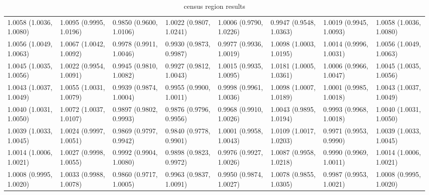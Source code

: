 \begin{table}[ht]
\begin{tabular}{llllllll}
  1.0058 (1.0036, 1.0080) & 1.0095 (0.9995, 1.0196) & 0.9850 (0.9600, 1.0106) & 1.0022 (0.9807, 1.0241) & 1.0006 (0.9790, 1.0226) & 0.9947 (0.9548, 1.0363) & 1.0019 (0.9945, 1.0093) & 1.0058 (1.0036, 1.0080) \\ 
  1.0056 (1.0049, 1.0063) & 1.0067 (1.0042, 1.0092) & 0.9978 (0.9911, 1.0046) & 0.9930 (0.9873, 0.9987) & 0.9977 (0.9936, 1.0019) & 1.0098 (1.0003, 1.0195) & 1.0014 (0.9996, 1.0031) & 1.0056 (1.0049, 1.0063) \\ 
  1.0045 (1.0035, 1.0056) & 1.0022 (0.9954, 1.0091) & 0.9945 (0.9810, 1.0082) & 0.9927 (0.9812, 1.0043) & 1.0015 (0.9935, 1.0095) & 1.0181 (1.0005, 1.0361) & 1.0006 (0.9966, 1.0047) & 1.0045 (1.0035, 1.0056) \\ 
  1.0043 (1.0037, 1.0049) & 1.0055 (1.0031, 1.0079) & 0.9939 (0.9874, 1.0004) & 0.9955 (0.9900, 1.0011) & 0.9998 (0.9961, 1.0036) & 1.0098 (1.0007, 1.0189) & 1.0001 (0.9985, 1.0018) & 1.0043 (1.0037, 1.0049) \\ 
  1.0040 (1.0031, 1.0050) & 1.0072 (1.0037, 1.0107) & 0.9897 (0.9802, 0.9993) & 0.9876 (0.9796, 0.9956) & 0.9968 (0.9910, 1.0026) & 1.0043 (0.9895, 1.0194) & 0.9993 (0.9968, 1.0018) & 1.0040 (1.0031, 1.0050) \\ 
  1.0039 (1.0033, 1.0045) & 1.0024 (0.9997, 1.0051) & 0.9869 (0.9797, 0.9942) & 0.9840 (0.9778, 0.9901) & 1.0001 (0.9958, 1.0043) & 1.0109 (1.0017, 1.0203) & 0.9971 (0.9953, 0.9990) & 1.0039 (1.0033, 1.0045) \\ 
  1.0014 (1.0006, 1.0021) & 1.0027 (0.9998, 1.0055) & 0.9992 (0.9904, 1.0080) & 0.9898 (0.9823, 0.9972) & 0.9976 (0.9927, 1.0026) & 1.0087 (0.9958, 1.0218) & 0.9990 (0.9969, 1.0011) & 1.0014 (1.0006, 1.0021) \\ 
  1.0008 (0.9995, 1.0020) & 1.0033 (0.9988, 1.0078) & 0.9860 (0.9717, 1.0005) & 0.9963 (0.9837, 1.0091) & 0.9950 (0.9874, 1.0027) & 1.0078 (0.9855, 1.0305) & 0.9987 (0.9953, 1.0021) & 1.0008 (0.9995, 1.0020) \\ 
   \hline
\end{tabular}
\caption{census region results} 
\label{tab:stratified_OR_table}
\end{table}
